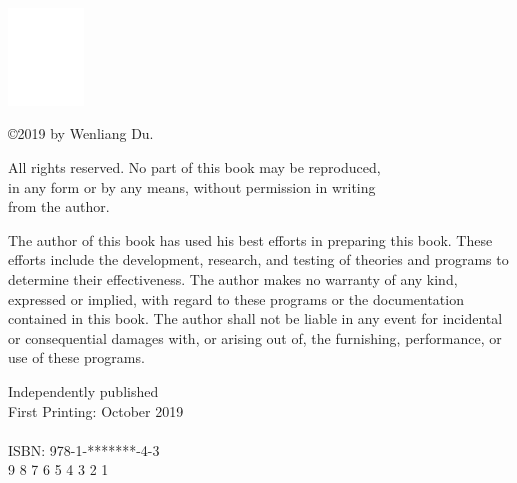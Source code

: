
\thispagestyle{empty}



\includegraphics[width=0.15\textwidth]{empty.pdf}\par\vspace{3cm}

\noindent
\copyright 2019 by Wenliang Du.

\vspace{1cm}
\noindent
All rights reserved. No part of this book may be reproduced,\\ 
in any form or by any means, without permission in writing\\ 
from the author.

\vspace{1cm}
\noindent
The author of this book has used his best efforts in preparing this book. These efforts
include the development, research, and testing of theories and programs to determine 
their effectiveness. The author makes no warranty of any kind, expressed or implied,
with regard to these programs or the documentation contained in this book. The author
shall not be liable in any event for incidental or consequential damages with, or arising out
of, the furnishing, performance, or use of these programs. 


\vspace{1cm}
\noindent
Independently published
\\
First Printing: October 2019\\
\\
ISBN: 978-1-*******-4-3\\


\vspace{1cm}
 9 8 7 6 5 4 3 2 1
 


